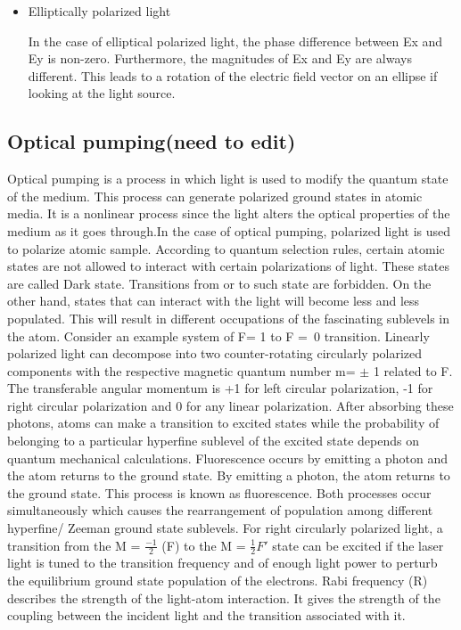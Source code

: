 \documentclass[12pt]{report}
\begin{document}
\begin{itemize}
\item Elliptically polarized light

In the case of elliptical polarized light, the phase difference between Ex and Ey is non-zero. Furthermore, the magnitudes of Ex and Ey are always different. This leads to a rotation of the electric field vector on an ellipse if looking at the light source.
\end{itemize}
\subsection{Optical pumping(need to edit)}
\bigskip
Optical pumping is a process in which light is used to modify the quantum state of the medium. This process can generate polarized ground states in atomic media. It is a nonlinear process since the light alters the optical properties of the medium as it goes through.In the case of optical pumping, polarized light is used to polarize atomic sample. According to quantum selection rules, certain atomic states are not allowed to interact with certain polarizations of light. These states are called Dark state. Transitions from or to such state are forbidden.  On the other hand, states that can interact with the light will become less and less populated. This will result in different occupations of the fascinating sublevels in the atom. Consider an example system of F= 1 to F =~0 transition.  Linearly polarized light can decompose into two counter-rotating circularly polarized components with the respective magnetic quantum number m= $\pm$ 1 related to F. The transferable angular momentum is +1 for left circular polarization, -1 for right circular polarization and 0 for any linear polarization. After absorbing these photons, atoms can make a transition to excited states while the probability of belonging to a particular hyperfine sublevel of the excited state depends on quantum mechanical calculations. Fluorescence occurs by emitting a photon and the atom returns to the ground state. By emitting a photon, the atom returns to the ground state. This process is known as fluorescence. Both processes occur simultaneously which causes the rearrangement of population among different hyperfine/ Zeeman ground state sublevels. For right circularly polarized light, a transition from the M = $\frac{-1}{2}$ (F) to the M = $\frac{1}{2} F' $ state can be excited if the laser light is tuned to the transition frequency and of enough light power to perturb the equilibrium ground state population of the electrons. Rabi frequency (R) describes the strength of the light-atom interaction. It gives the strength of the coupling between the incident light and the transition associated with it.
\end{document}
